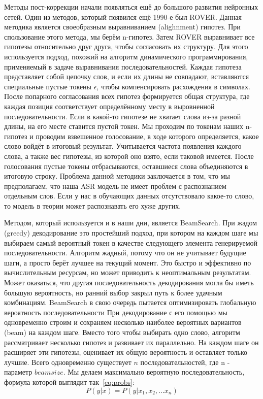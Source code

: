 Методы пост-коррекции начали появляться ещё до большого развития нейронных сетей.
Один из методов, который появился ещё 1990-е был ROVER.
Данная методика является своеобразным выравниванием (alighnment) гипотез.
При спользование этого метода, мы берём n-гипотез. 
Затем ROVER выравнивает все гипотезы относительно друг друга, чтобы согласовать их структуру.
Для этого используется подход, похожий на алгоритм динамического программирования, применяемый в задаче выравнивания последовательностей.
Каждая гипотеза представляет собой цепочку слов, и если их длины не совпадают, вставляются специальные пустые токены $\epsilon$, чтобы компенсировать расхождения в символах.
После попарного согласования всех гипотез формируется общая структура, где каждая позиция соответствует определённому месту в выровненной последовательности.
Если в какой-то гипотезе не хватает слова из-за разной длины, на его месте ставится пустой токен.
Мы проходим по токенам наших n-гипотез и проводим взвешенное голосование, в ходе которого определяется, какое слово войдёт в итоговый результат.
Учитывается частота появления каждого слова, а также вес гипотезы, из которой оно взято, если таковой имеется.
После голосования пустые токены отбрасываются, оставшиеся слова объединяются в итоговую строку.
Проблема данной методики заключается в том, что мы предполагаем, что наша ASR модель не имеет проблем с распознанием отдельным слов.
Если у нас в обучающих данных отсутствовало какое-то слово, то модель в теории может распознавать его хуже других.

Методом, который используется и в наши дни, является BeamSearch.
При жадом (greedy) декодирование это простейший подход, при котором на каждом шаге мы выбираем самый вероятный токен в качестве следующего элемента генерируемой последовательности.
Алгоритм жадный, потому что он не учитывает будущие шаги, а просто берёт лучшее на текущий момент.
Это быстро и эффективно по вычислительным ресурсам, но может приводить к неоптимальным результатам.
Может оказаться, что другая последовательность декодирования могла бы иметь большую вероятность, но ранний выбор закрыл путь к более удачным комбинациям.
BeamSearch в свою очередь пытается оптимизировать глобальную вероятность последовательности
При декодирование с его помощью мы одновременно строим и сохраняем несколько наиболее вероятных вариантов (beam) на каждом шаге.
Вместо того чтобы выбирать одно слово, алгоритм рассматривает несколько гипотез и развивает их параллельно.
На каждом шаге он расширяет эти гипотезы, оценивает их общую вероятность и оставляет только лучшие.
Всего одновременно существует $n$ последовательностей, где n - параметр $beam size$.
Мы делаем максимально вероятную последовательность, формула которой выглядит так~\ref{eq:probs}:
\begin{equation}
  P(y|x) = P(y|x_1,x_2,\dots x_n)
  \label{eq:probs}
\end{equation}

